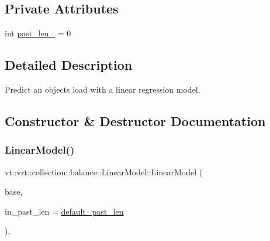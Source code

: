 \subsection*{Private Attributes}
\begin{DoxyCompactItemize}
\item 
int \hyperlink{structvt_1_1vrt_1_1collection_1_1balance_1_1_linear_model_a1fb9ade3b0967df8c59770d53d0b8f97}{past\+\_\+len\+\_\+} = 0
\end{DoxyCompactItemize}


\subsection{Detailed Description}
Predict an object\textquotesingle{}s load with a linear regression model. 

\subsection{Constructor \& Destructor Documentation}
\mbox{\label{structvt_1_1vrt_1_1collection_1_1balance_1_1_linear_model_a5635a178ad9efde93b96d5f44e849175}} 
\subsubsection{\texorpdfstring{Linear\+Model()}{LinearModel()}}
{\footnotesize\ttfamily vt\+::vrt\+::collection\+::balance\+::\+Linear\+Model\+::\+Linear\+Model (\begin{DoxyParamCaption}\item[{std\+::shared\+\_\+ptr$<$ \hyperlink{classvt_1_1vrt_1_1collection_1_1balance_1_1_load_model}{balance\+::\+Load\+Model} $>$}]{base,  }\item[{int}]{in\+\_\+past\+\_\+len = {\ttfamily \hyperlink{structvt_1_1vrt_1_1collection_1_1balance_1_1_linear_model_a17d295e933227905ba94ea69f1cbfb64}{default\+\_\+past\+\_\+len}} }\end{DoxyParamCaption})\hspace{0.3cm}{\ttfamily [inline]}, {\ttfamily [explicit]}}



